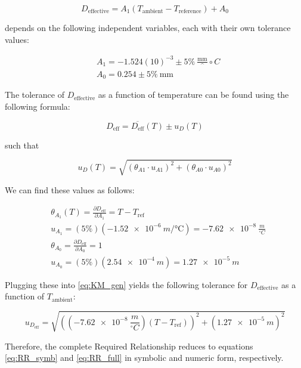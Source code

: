 \documentclass[12pt, letterpaper]{report}%
\newcommand{\degC}{^{\circ}C}    %
\newcommand{\requiredRelationship}{D_{\text{effective}} = A_1 (T_{\text{ambient}} - T_{\text{reference}}) + A_0}
\newcommand{\specTolerancePercent}{\pm 5\%}
\newcommand{\specDeffConstOne}{-1.524(10)^{-3}} %
\newcommand{\specDeffConstTwo}{0.254} %
\begin{document}
\begin{appendices}
        $$ \requiredRelationship $$

    depends on the following independent variables, each with their own tolerance values:

        \begin{align*}
            &A_1 = \specDeffConstOne \specTolerancePercent\ \frac{\text{mm}}\degC
            \\
            &A_0 = \specDeffConstTwo \specTolerancePercent\ \text{mm}
        \end{align*}

    The tolerance of $D_{\text{effective}}$ as a function of temperature can be found using the following formula:

        \begin{equation}
            D_{\text{eff}} = \overline{D_{\text{eff}}}(T) \pm u_D(T)
        \end{equation}

    such that

        \begin{equation}
            u_D(T) = \sqrt{\left( \theta_{A1} \cdot u_{A1} \right)^2 + \left( \theta_{A0} \cdot u_{A0} \right)^2}
            \label{eq:KM_gen}
        \end{equation}

    We can find these values as follows:

        \begin{align}
            &\theta_{A_1}(T) = \frac{\partial D_{\text{eff}}}{\partial A_1} = T - T_{\text{ref}}
            \\
            &u_{A_1} = (5\%)(\SI{-1.52e-6}{m \per \degreeCelsius}) = \SI{-7.62e-8}{} \frac{m}{\degC}
            \\
            &\theta_{A_0} = \frac{\partial D_{\text{eff}}}{\partial A_0} = 1
            \\
            &u_{A_0} = (5\%)(\SI{2.54e-4}{m}) = \SI{1.27e-5}{m}
        \end{align}

    Plugging these into \ref{eq:KM_gen} yields the following tolerance for $D_{\text{effective}}$ as a function of $T_{\text{ambient}}$:

        \begin{equation}
            u_{D_{\text{eff}}} = \sqrt{\left( (\SI{-7.62e-8}{} \frac{m}{\degC}) (T-T_{\text{ref}}) \right)^2 + \left( \SI{1.27e-5}{m} \right)^2}
        \end{equation}

    Therefore, the complete Required Relationship reduces to equations \ref{eq:RR_symb} and \ref{eq:RR_full} in symbolic and numeric form, respectively.


\end{appendices}
\end{document}
